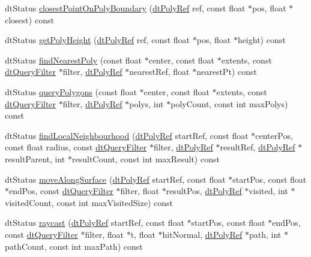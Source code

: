 \begin{Indent}
\begin{DoxyCompactItemize}
\item 
dt\+Status \hyperlink{classdtNavMeshQuery_aa53b9573e61eda951213ea9e4354e744}{closest\+Point\+On\+Poly\+Boundary} (\hyperlink{group__detour_gab4e0b2257a670c1a800057999612b466}{dt\+Poly\+Ref} ref, const float $\ast$pos, float $\ast$closest) const
\item 
dt\+Status \hyperlink{classdtNavMeshQuery_af8303a12749e252c6688c15c5c887b69}{get\+Poly\+Height} (\hyperlink{group__detour_gab4e0b2257a670c1a800057999612b466}{dt\+Poly\+Ref} ref, const float $\ast$pos, float $\ast$height) const
\item 
dt\+Status \hyperlink{classdtNavMeshQuery_aed1dfebde233657db668416ceaee8537}{find\+Nearest\+Poly} (const float $\ast$center, const float $\ast$extents, const \hyperlink{classdtQueryFilter}{dt\+Query\+Filter} $\ast$filter, \hyperlink{group__detour_gab4e0b2257a670c1a800057999612b466}{dt\+Poly\+Ref} $\ast$nearest\+Ref, float $\ast$nearest\+Pt) const
\item 
dt\+Status \hyperlink{classdtNavMeshQuery_ae7eb88f9f77aa29f1c85f8ccf8ad1d49}{query\+Polygons} (const float $\ast$center, const float $\ast$extents, const \hyperlink{classdtQueryFilter}{dt\+Query\+Filter} $\ast$filter, \hyperlink{group__detour_gab4e0b2257a670c1a800057999612b466}{dt\+Poly\+Ref} $\ast$polys, int $\ast$poly\+Count, const int max\+Polys) const
\item 
dt\+Status \hyperlink{classdtNavMeshQuery_a9864032da48ba6f1055deab90633ffd6}{find\+Local\+Neighbourhood} (\hyperlink{group__detour_gab4e0b2257a670c1a800057999612b466}{dt\+Poly\+Ref} start\+Ref, const float $\ast$center\+Pos, const float radius, const \hyperlink{classdtQueryFilter}{dt\+Query\+Filter} $\ast$filter, \hyperlink{group__detour_gab4e0b2257a670c1a800057999612b466}{dt\+Poly\+Ref} $\ast$result\+Ref, \hyperlink{group__detour_gab4e0b2257a670c1a800057999612b466}{dt\+Poly\+Ref} $\ast$result\+Parent, int $\ast$result\+Count, const int max\+Result) const
\item 
dt\+Status \hyperlink{classdtNavMeshQuery_a95f6d7c92a75c7773ababeb144206968}{move\+Along\+Surface} (\hyperlink{group__detour_gab4e0b2257a670c1a800057999612b466}{dt\+Poly\+Ref} start\+Ref, const float $\ast$start\+Pos, const float $\ast$end\+Pos, const \hyperlink{classdtQueryFilter}{dt\+Query\+Filter} $\ast$filter, float $\ast$result\+Pos, \hyperlink{group__detour_gab4e0b2257a670c1a800057999612b466}{dt\+Poly\+Ref} $\ast$visited, int $\ast$visited\+Count, const int max\+Visited\+Size) const
\item 
dt\+Status \hyperlink{classdtNavMeshQuery_a7509a4bf31a215f20478c5050ef25913}{raycast} (\hyperlink{group__detour_gab4e0b2257a670c1a800057999612b466}{dt\+Poly\+Ref} start\+Ref, const float $\ast$start\+Pos, const float $\ast$end\+Pos, const \hyperlink{classdtQueryFilter}{dt\+Query\+Filter} $\ast$filter, float $\ast$t, float $\ast$hit\+Normal, \hyperlink{group__detour_gab4e0b2257a670c1a800057999612b466}{dt\+Poly\+Ref} $\ast$path, int $\ast$path\+Count, const int max\+Path) const

\end{DoxyCompactItemize}
\end{Indent}
